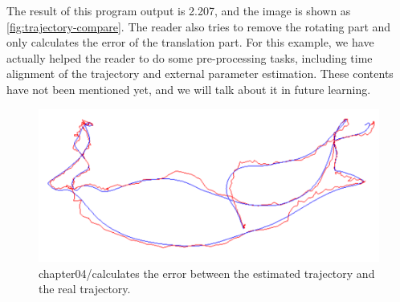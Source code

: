 The result of this program output is 2.207, and the image is shown as \autoref{fig:trajectory-compare}. The reader also tries to remove the rotating part and only calculates the error of the translation part. For this example, we have actually helped the reader to do some pre-processing tasks, including time alignment of the trajectory and external parameter estimation. These contents have not been mentioned yet, and we will talk about it in future learning.

\begin{figure}[!ht]
	\centering
	\includegraphics[width=1.0\textwidth]{chapter04/lieGroup/trajectory-compare.pdf}
	\caption{chapter04/calculates the error between the estimated trajectory and the real trajectory. }
	\label{fig:trajectory-compare}
\end{figure}